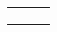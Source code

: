 \documentclass[10pt,a4paper]{article}
\begin{document}
\begin{tabular}{C{0.3090\textwidth} C{0.3075\textwidth} C{0.3065\textwidth}}
{%
\vspace*{0.345em}\\%
%
} & 
\end{tabular}
\end{document}
